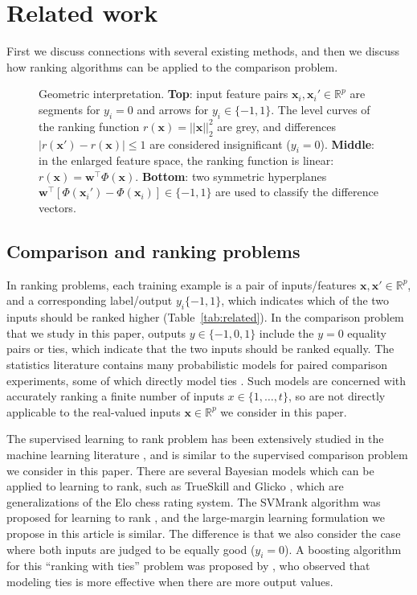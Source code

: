 \documentclass[twoside,11pt]{article}
\newcommand{\RR}{\mathbb R}
\begin{document}
\section{Related work}
\label{sec:related}

First we discuss connections with several existing methods, and then
we discuss how ranking algorithms can be applied to the comparison
problem.


\begin{figure}
  \centering
  
  \vskip -0.5cm
  \caption{Geometric interpretation. \textbf{Top}: input feature pairs
    $\mathbf x_i,\mathbf x_i'\in\RR^p$ are segments for $y_i=0$ and
    arrows for $y_i\in\{-1,1\}$. The level curves of the ranking
    function $r(\mathbf x)=||\mathbf x||_2^2$ are grey, and
    differences $|r(\mathbf x')-r(\mathbf x)|\leq 1$ are considered
    insignificant ($y_i=0$). \textbf{Middle}: in the enlarged feature
    space, the ranking function is linear: $r(\mathbf x)=\mathbf
    w^\intercal \Phi(\mathbf x)$. \textbf{Bottom}: two symmetric
    hyperplanes $\mathbf w^\intercal[\Phi(\mathbf x_i')-\Phi(\mathbf
    x_i)]\in\{-1,1\}$ are used to classify the difference vectors.}
  \label{fig:norm-data}
\end{figure}

\subsection{Comparison and ranking problems}

In ranking problems, each training example is a pair of
inputs/features $\mathbf x,\mathbf x'\in\RR^p$, and a corresponding
label/output $y_i\{-1,1\}$, which indicates which of the two inputs
should be ranked higher (Table~\ref{tab:related}). In the comparison
problem that we study in this paper, outputs $y\in\{-1,0,1\}$ include
the $y=0$ equality pairs or ties, which indicate that the two inputs
should be ranked equally.  The statistics literature contains many
probabilistic models for paired comparison experiments, some of which
directly model ties \citep{davidson-ties}. Such models are concerned
with accurately ranking a finite number of inputs $x\in\{1,\dots,t\}$,
so are not directly applicable to the real-valued inputs
$\mathbf x\in\RR^p$ we consider in this paper. 

The supervised learning to rank problem has been extensively studied
in the machine learning literature \citep{object-ranking-methods,
  learning-to-rank}, and is similar to the supervised comparison
problem we consider in this paper. There are several Bayesian models
which can be applied to learning to rank, such as TrueSkill
\citep{trueskill} and Glicko \citep{Glicko}, which are generalizations
of the Elo chess rating system. The SVMrank algorithm was
proposed for learning to rank \citep{ranksvm}, and the large-margin
learning formulation we propose in this article is similar. The
difference is that we also consider the case where both inputs are
judged to be equally good ($y_i=0$). A boosting algorithm for this
``ranking with ties'' problem was proposed by \citet{rank-with-ties},
who observed that modeling ties is more effective when there are more
output values.
\end{document}
